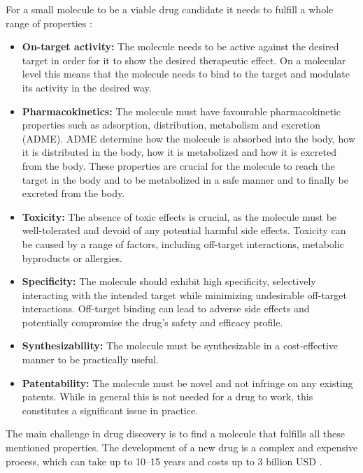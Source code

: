 For a small molecule to be a viable drug candidate it needs to fulfill a whole range of properties \citep{todo}:
\begin{itemize}
      \item \textbf{On-target activity:} The molecule needs to be active against the desired target in
            order for it to show the desired therapeutic effect. On a molecular level this means that the
            molecule needs to bind to the target and modulate its activity in the desired way.
      \item \textbf{Pharmacokinetics:} The molecule must have favourable pharmacokinetic properties
            such as adsorption, distribution, metabolism and excretion (ADME). ADME determine how the
            molecule is absorbed into the body, how it is distributed in the body, how it is metabolized and
            how it is excreted from the body. These properties are crucial for the molecule to reach the
            target in the body and to be metabolized in a safe manner and to finally be excreted from the
            body.
      \item \textbf{Toxicity:}  The absence of toxic effects is crucial, as the molecule must be
            well-tolerated and devoid of any potential harmful side effects. Toxicity can be caused by a
            range of factors, including off-target interactions, metabolic byproducts or allergies.
      \item \textbf{Specificity:}  The molecule should exhibit high specificity, selectively
            interacting with the intended target while minimizing undesirable off-target interactions.
            Off-target binding can lead to adverse side effects and potentially compromise the drug's safety
            and efficacy profile.
      \item \textbf{Synthesizability:} The molecule must be synthesizable in a cost-effective manner to be
            practically useful.
      \item \textbf{Patentability:} The molecule must be novel and not infringe on any existing
            patents. While in general this is not needed for a drug to work, this constitutes a significant
            issue in practice.
\end{itemize}

The main challenge in drug discovery is to find a molecule that fulfills all these mentioned
properties. The development of a new drug is a complex and expensive process, which can take up to
10--15 years and costs up to 3 billion USD \citep{todo}.


